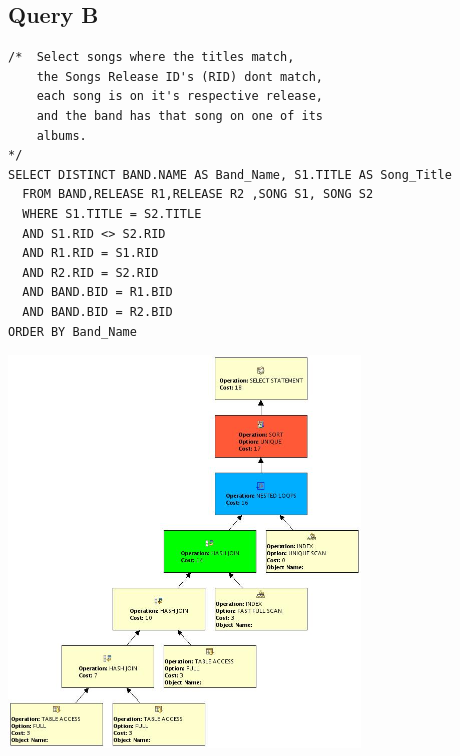 \documentclass{report}
\begin{document}
\subsection*{Query B}
\begin{verbatim}
/*  Select songs where the titles match,
    the Songs Release ID's (RID) dont match,
    each song is on it's respective release,
    and the band has that song on one of its
    albums.    
*/
SELECT DISTINCT BAND.NAME AS Band_Name, S1.TITLE AS Song_Title
  FROM BAND,RELEASE R1,RELEASE R2 ,SONG S1, SONG S2
  WHERE S1.TITLE = S2.TITLE
  AND S1.RID <> S2.RID
  AND R1.RID = S1.RID
  AND R2.RID = S2.RID
  AND BAND.BID = R1.BID
  AND BAND.BID = R2.BID
ORDER BY Band_Name
\end{verbatim}
\includegraphics[width=0.7\textwidth]{Q1B}
\end{document}
